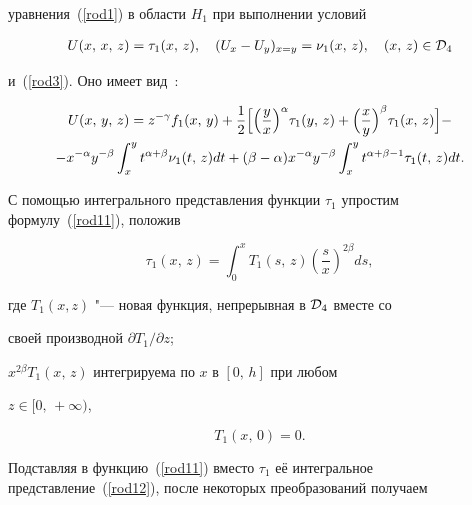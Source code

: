 уравнения~(\ref{rod1}) в области $H_1$ при выполнении условий

\begin{gather*}

U(x,\,x,\,z)=\tau_1(x,\,z),\quad

(U_x-U_y)_{x=y}=\nu_1(x,\,z), \quad (x,\,z)\in {\cal D}_4

\end{gather*}

и~(\ref{rod3}). Оно имеет вид~\cite{rodlit1}:

\begin{multline}

U(x,\,y,\,z)=z^{-\gamma}f_1(x,\,y)+\frac{1}{2}\Bigl[\Bigl(\frac{y}{x}\Bigr)^\alpha\tau_1(y,\,z)+

\Bigl(\frac{x}{y}\Bigr)^\beta\tau_1(x,\,z)\Bigr]- \label{rod11}

\\

-x^{-\alpha}y^{-\beta}\int _x^yt^{\alpha+\beta}\nu_1(t,\,z)dt+(\beta-\alpha)

x^{-\alpha}y^{-\beta}\int _x^yt^{\alpha+\beta-1}\tau_1(t,\,z)dt.

\end{multline}



С помощью интегрального представления функции $\tau_1$ упростим формулу~(\ref{rod11}), положив

\begin{equation}

\tau_1(x,\,z)=\int _0^xT_1(s,\,z)\left(\frac{s}{x}\right)^{2\beta}

ds, \label{rod12}

\end{equation}

где $T_1(x, z)$ "--- новая функция, непрерывная в ${\cal D}_4$ вместе со

своей производной ${\partial T_1}/{\partial z}$;

$x^{2\beta}T_1(x,\,z)$ интегрируема по $x$ в $[0,\,h]$ при любом

$z\in [0,\,+\infty)$,

\begin{equation}

T_1(x,\,0)=0. \label{rod13}

\end{equation}

 Подставляя в функцию~(\ref{rod11}) вместо $\tau_1$ её интегральное представление~(\ref{rod12}), после некоторых преобразований получаем

